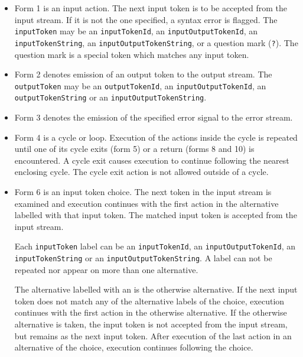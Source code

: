 \begin{itemize}
\item Form 1 is an input action.         The next input token is  to
be  accepted  from  the  input stream.  If it is not the one
specified, a syntax error is flagged.  The {\tt inputToken} may be
an {\tt inputTokenId}, an {\tt inputOutputTokenId}, an {\tt inputTokenString},
an {\tt inputOutputTokenString}, or  a  question  mark  ({\tt ?}).
The question  mark      is  a  special token which matches any input
token.
\item Form 2 denotes emission of an output token to the output  stream.   
The {\tt outputToken} may be an {\tt outputTokenId}, an
{\tt inputOutputTokenId}, an {\tt outputTokenString} or an
{\tt inputOutputTokenString}.
\item Form 3 denotes the emission of the specified error signal to the error stream.
\item Form 4 is a cycle or loop.         Execution  of  the  actions
inside  the  cycle  is repeated until one of its cycle exits
(form 5) or a return (forms 8 and 10)  is       encountered.
A  cycle  exit  causes  execution  to continue following the
nearest enclosing cycle.   The  cycle  exit  action  is  not
allowed outside of a cycle.
\item Form 6 is an input token choice.  The next token in the
input stream is examined and execution  continues  with  the
first  action  in  the  alternative labelled with that input
token.  The matched input token is accepted from  the  input
stream.

Each {\tt inputToken} label  can  be  an {\tt inputTokenId},  an
{\tt inputOutputTokenId}, an {\tt inputTokenString} or an 
{\tt inputOutputTokenString}.  A label can not be repeated nor appear 
on more than one alternative.

The alternative labelled with an  {\tt *}  is  the  otherwise
alternative.   If the next input token does not match any of
the alternative labels of the  choice,  execution  continues
with  the first action in the otherwise alternative.  If the
otherwise alternative is  taken,  the  input  token  is  not
accepted  from  the  input  stream,  but remains as the next
input token.  After execution  of  the  last  action  in  an
alternative of the choice, execution continues following the
choice.


\end{itemize}
